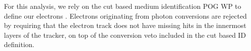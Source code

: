 \documentclass[a4paper, 10pt, openright]{report}
\begin{document}
For this analysis, we rely on the cut based medium identification \ac{POG} \ac{WP} to define our electrons \cite{EleWPs}. Electrons originating from photon conversions are rejected by requiring that the electron track does not have missing hits in the innermost layers of the tracker, on top of the conversion veto included in the cut based ID definition.


%

\end{document}
